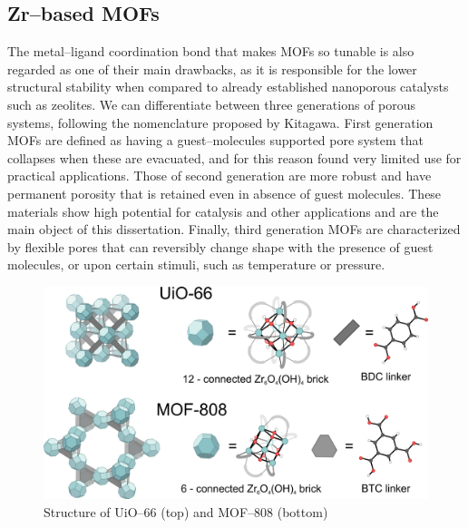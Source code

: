 \subsection*{Zr--based MOFs}
The metal--ligand coordination bond that makes MOFs so tunable is also regarded as one of their main drawbacks, as it is responsible for the lower structural stability when compared to already established nanoporous catalysts such as zeolites. We can differentiate between three generations of porous systems, following the nomenclature proposed by Kitagawa\cite{kitagawa1998functional}. First generation MOFs are defined as having a guest--molecules supported pore system that collapses when these are evacuated, and for this reason found very limited use for practical applications. Those of second generation are more robust and have permanent porosity that is retained even in absence of guest molecules. These materials show high potential for catalysis and other applications and are the main object of this dissertation. Finally, third generation MOFs are characterized by flexible pores that can reversibly change shape with the presence of guest molecules, or upon certain stimuli, such as temperature or pressure. 
\begin{figure}[!htbp]
	\centering
 	\includegraphics[width=1.0\textwidth]{Zr-MOFs}
	\caption{Structure of UiO--66 (top) and MOF--808 (bottom)}
	\label{fig:Zr-MOFs}
\end{figure}

